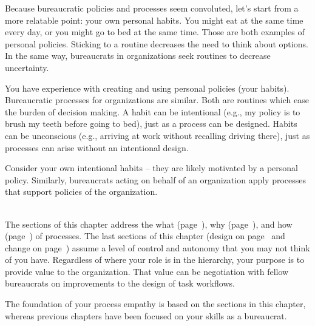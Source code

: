 
Because bureaucratic policies and processes seem convoluted, let's start from a more relatable point: your own personal habits.
You might eat at the same time every day, or you might go to bed at the same time. Those are both examples of personal policies. Sticking to a routine decreases the need to think about options. In the same way, bureaucrats in organizations seek routines to decrease uncertainty. 

You have experience with creating and using personal policies (your habits).  Bureaucratic processes for organizations are similar.
Both are routines which ease the burden of decision making. A habit can be intentional (e.g., my policy is to brush my teeth before going to bed), just as a process can be designed. Habits can be unconscious (e.g., arriving at work without recalling driving there), just as processes can arise without an intentional design. 

Consider your own intentional habits -- they are likely motivated by a personal policy. Similarly, bureaucrats acting on behalf of an organization apply processes that support policies of the organization.

\ \\

The sections of this chapter address the what (page~\pageref{sec:definition-of-process}), why (page~\pageref{sec:why-processes-exist}), and how (page~\pageref{sec:process-chaos}) of processes. 
The last sections of this chapter (design on page~\pageref{sec:design-of-processes} and change on page~\pageref{sec:change-a-process}) assume a level of control and autonomy that you may not think of you have. Regardless of where your role is in the hierarchy, your purpose is to provide value to the organization. That value can be negotiation with fellow bureaucrats on improvements to the design of task workflows. 

The foundation of your \gls{process empathy} is based on the sections in this chapter, whereas previous chapters have been focused on your skills as a bureaucrat. 